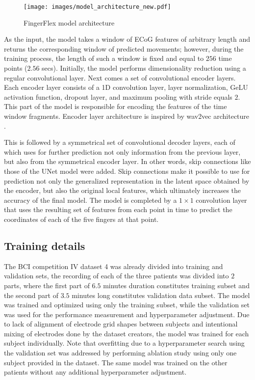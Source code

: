 \documentclass[letterpaper]{article} \usepackage{aaai22}  \usepackage{times}  \usepackage{helvet}  \usepackage{courier}  \usepackage[hyphens]{url}  \usepackage{graphicx} \urlstyle{rm} \def\UrlFont{\rm}  \usepackage{natbib}  \usepackage{caption} \DeclareCaptionStyle{ruled}{labelfont=normalfont,labelsep=colon,strut=off} \frenchspacing  \setlength{\pdfpagewidth}{8.5in}  \setlength{\pdfpageheight}{11in}  \usepackage{algorithm}
\begin{document}
\begin{figure*}[ht]
    \centering
    \texttt{[image: images/model\_architecture\_new.pdf]}
    \caption{FingerFlex model architecture}
    \label{fig:model_architecture}
\end{figure*}





As the input, the model takes a window of ECoG features of arbitrary length and returns the corresponding window of predicted movements; however, during the training process, the length of such a window is fixed and equal to $256$ time points ($2.56$ secs). Initially, the model performs dimensionality reduction using a regular convolutional layer. Next comes a set of convolutional encoder layers. Each encoder layer consists of a 1D convolution layer, layer normalization, GeLU activation function, dropout layer, and maximum pooling with stride equals $2$. This part of the model is responsible for encoding the features of the time window fragments. Encoder layer architecture is inspired by wav2vec architecture \citep{schneider2019}.

This is followed by a symmetrical set of convolutional decoder layers, each of which uses for further prediction not only information from the previous layer, but also from the symmetrical encoder layer. In other words, skip connections like those of the UNet model \citep{ronneberger2015} were added. Skip connections make it possible to use for prediction not only the generalized representation in the latent space obtained by the encoder, but also the original local features, which ultimately increases the accuracy of the final model. The model is completed by a $1\times1$ convolution layer that uses the resulting set of features from each point in time to predict the coordinates of each of the five fingers at that point.


\subsection{Training details}

The BCI competition IV dataset 4 was already divided into training and validation sets, the recording of each of the three patients was divided into $2$ parts, where the first part of $6.5$ minutes duration constitutes training subset and the second part of $3.5$ minutes long constitutes validation data subset. The model was trained and optimized using only the training subset, while the validation set was used for the performance measurement and hyperparameter adjustment. Due to lack of alignment of electrode grid shapes between subjects and intentional mixing of electrodes done by the dataset creators, the model was trained for each subject individually. Note that overfitting due to a hyperparameter search using the validation set was addressed by performing ablation study using only one subject provided in the dataset. The same model was trained on the other patients without any additional hyperparameter adjustment.
\end{document}
